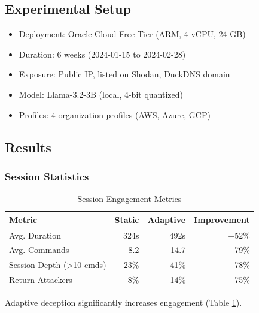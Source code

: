 \documentclass[10pt,conference]{IEEEtran}
\begin{document}
\subsection{Experimental Setup}
\begin{itemize}
    \item Deployment: Oracle Cloud Free Tier (ARM, 4 vCPU, 24 GB)
    \item Duration: 6 weeks (2024-01-15 to 2024-02-28)
    \item Exposure: Public IP, listed on Shodan, DuckDNS domain
    \item Model: Llama-3.2-3B (local, 4-bit quantized)
    \item Profiles: 4 organization profiles (AWS, Azure, GCP)
\end{itemize}

\subsection{Results}

\subsubsection{Session Statistics}
\begin{table}[htbp]
\centering
\caption{Session Engagement Metrics}
\label{tab:engagement}
\begin{tabular}{@{}lrrr@{}}
\toprule
\textbf{Metric} & \textbf{Static} & \textbf{Adaptive} & \textbf{Improvement} \\
\midrule
Avg. Duration & 324s & 492s & +52\% \\
Avg. Commands & 8.2 & 14.7 & +79\% \\
Session Depth (>10 cmds) & 23\% & 41\% & +78\% \\
Return Attackers & 8\% & 14\% & +75\% \\
\bottomrule
\end{tabular}
\end{table}

Adaptive deception significantly increases engagement (Table \ref{tab:engagement}).
\end{document}
